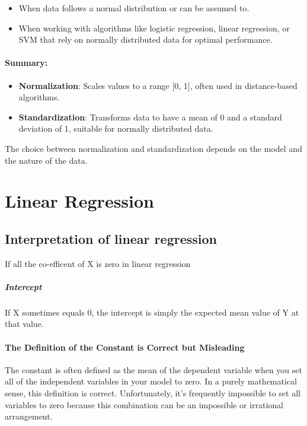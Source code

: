 \documentclass[12pt]{book}
\providecommand{\tightlist}{%
  \setlength{\itemsep}{0pt}\setlength{\parskip}{0pt}}
\begin{document}
\begin{itemize}
\tightlist
\item
  When data follows a normal distribution or can be assumed to.
\item
  When working with algorithms like logistic regression, linear
  regression, or SVM that rely on normally distributed data for optimal
  performance.
\end{itemize}

\subsubsection{Summary:}\label{summary}

\begin{itemize}
\tightlist
\item
  \textbf{Normalization}: Scales values to a range {[}0, 1{]}, often
  used in distance-based algorithms.
\item
  \textbf{Standardization}: Transforms data to have a mean of 0 and a
  standard deviation of 1, suitable for normally distributed data.
\end{itemize}

The choice between normalization and standardization depends on the
model and the nature of the data.


\chapter{Linear Regression}

\section{Interpretation of linear regression}

If all the co-efficent of X is zero in linear regression

\paragraph*{Intercept}{If X sometimes equals 0, the intercept is simply the expected mean value of Y at that value.}


\subsubsection*{The Definition of the Constant is Correct but Misleading}

The constant is often defined as the mean of the dependent variable when you set all of the independent variables in your model to zero. In a purely mathematical sense, this definition is correct. Unfortunately, it’s frequently impossible to set all variables to zero because this combination can be an impossible or irrational arrangement.
\end{document}
